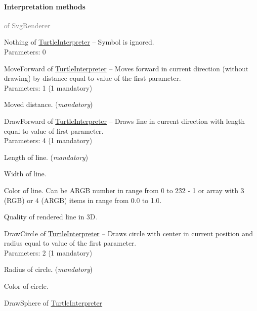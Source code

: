 	\paragraph{Interpretation methods}\textcolor{gray}{of SvgRenderer}
	\begin{description*}
		\item[Nothing] of \hyperref[Malsys.Processing.Components.Interpreters.TurtleInterpreter]{TurtleInterpreter}
			-- Symbol is ignored.
		\\ Parameters: 0 
		\item[MoveForward] of \hyperref[Malsys.Processing.Components.Interpreters.TurtleInterpreter]{TurtleInterpreter}
			-- Moves forward in current direction (without drawing) by distance equal to value of the first parameter.
		\\ Parameters: 1  (1 mandatory) 
			\begin{enumerate*}
				\item
Moved distance. (\textit{mandatory}) 			\end{enumerate*}
		\item[DrawForward] of \hyperref[Malsys.Processing.Components.Interpreters.TurtleInterpreter]{TurtleInterpreter}
			-- Draws line in current direction with length equal to value of first parameter.
		\\ Parameters: 4  (1 mandatory) 
			\begin{enumerate*}
				\item
Length of line. (\textit{mandatory}) 				\item
            Width of line.				\item
            Color of line. Can be ARGB number in range from 0 to 2\^32 - 1 or array with 3 (RGB) or 4 (ARGB) items in range from 0.0 to 1.0.				\item
            Quality of rendered line in 3D.			\end{enumerate*}
		\item[DrawCircle] of \hyperref[Malsys.Processing.Components.Interpreters.TurtleInterpreter]{TurtleInterpreter}
			-- Draws circle with center in current position and radius equal to value of the first parameter.
		\\ Parameters: 2  (1 mandatory) 
			\begin{enumerate*}
				\item
Radius of circle. (\textit{mandatory}) 				\item
            Color of circle.			\end{enumerate*}
		\item[DrawSphere] of \hyperref[Malsys.Processing.Components.Interpreters.TurtleInterpreter]{TurtleInterpreter}

\end{description*}
